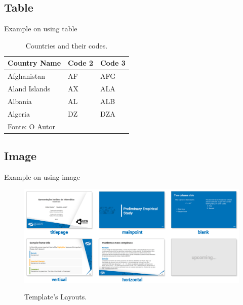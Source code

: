 \documentclass[aspectratio=169,t,xcolor=table]{beamer}
\begin{document}
\subsection{Table}
\begin{frame}{Example on using table}

    \begin{table}[]
        \centering
        \caption{\label{tab:1}Countries and their codes.}
        
        \renewcommand{\arraystretch}{1.5}
        \setlength{\tabcolsep}{10pt}
        
        {
            \begin{tabular}{ p{3cm}p{3cm}p{3cm}  }
                \toprule 
                \textbf{Country Name} & \textbf{Code 2} & \textbf{Code 3} \\
                \midrule
                Afghanistan & AF &AFG \\
                Aland Islands & AX   & ALA \\
                Albania &AL & ALB \\
                Algeria    &DZ & DZA \\
                \bottomrule
								\multicolumn{3}{l}{Fonte: O Autor} \\ 
            \end{tabular}
        }
    \end{table}
    
\end{frame}

\subsection{Image}

\begin{frame}{Example on using image}

    \begin{figure}
        \centering
				\caption{Template's Layouts.}
        \includegraphics[width=.9\textwidth]{readme/layouts.png}
        \label{fig:layouts}
    \end{figure}
    
\end{frame}
\end{document}
